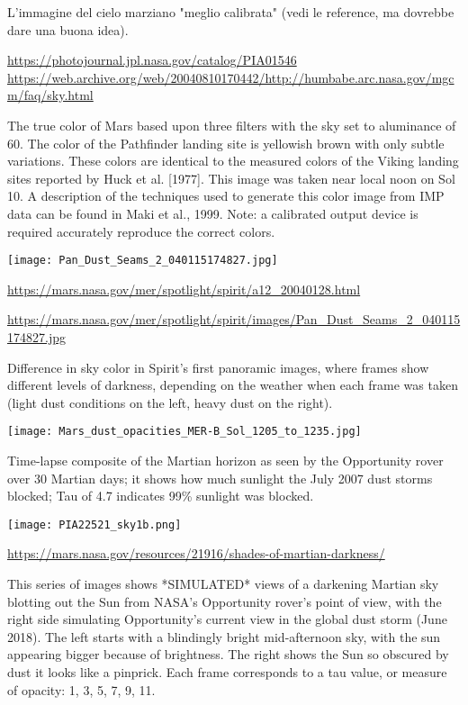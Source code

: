 \documentclass[a4paper,10pt,openany,oneside]{memoir}
\begin{document}
L'immagine del cielo marziano "meglio calibrata" (vedi le reference, ma dovrebbe dare una buona idea).

\url{https://photojournal.jpl.nasa.gov/catalog/PIA01546} \url{https://web.archive.org/web/20040810170442/http://humbabe.arc.nasa.gov/mgcm/faq/sky.html}

The true color of Mars based upon three filters with the sky set to aluminance of 60. The color of the Pathfinder landing site is yellowish brown with only subtle variations. These colors are identical to the measured colors of the Viking landing sites reported by Huck et al. [1977]. This image was taken near local noon on Sol 10. A description of the techniques used to generate this color image from IMP data can be found in Maki et al., 1999. Note: a calibrated output device is required accurately reproduce the correct colors.


\texttt{[image: Pan\_Dust\_Seams\_2\_040115174827.jpg]}

\url{https://mars.nasa.gov/mer/spotlight/spirit/a12_20040128.html}

\url{https://mars.nasa.gov/mer/spotlight/spirit/images/Pan_Dust_Seams_2_040115174827.jpg}

Difference in sky color in Spirit's first panoramic images, where frames show different levels of darkness, depending on the weather when each frame was taken (light dust conditions on the left, heavy dust on the right). 


\texttt{[image: Mars\_dust\_opacities\_MER-B\_Sol\_1205\_to\_1235.jpg]}

Time-lapse composite of the Martian horizon as seen by the Opportunity rover over 30 Martian days; it shows how much sunlight the July 2007 dust storms blocked; Tau of 4.7 indicates 99\% sunlight was blocked.


\texttt{[image: PIA22521\_sky1b.png]}

\url{https://mars.nasa.gov/resources/21916/shades-of-martian-darkness/}

This series of images shows *SIMULATED* views of a darkening Martian sky blotting out the Sun from NASA’s Opportunity rover’s point of view, with the right side simulating Opportunity’s current view in the global dust storm (June 2018). The left starts with a blindingly bright mid-afternoon sky, with the sun appearing bigger because of brightness. The right shows the Sun so obscured by dust it looks like a pinprick. Each frame corresponds to a tau value, or measure of opacity: 1, 3, 5, 7, 9, 11.
\end{document}
